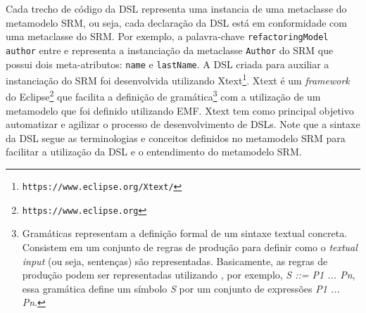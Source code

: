 Cada trecho de código da DSL representa uma instancia de uma metaclasse do metamodelo SRM, ou seja, cada declaração da DSL está em conformidade com uma metaclasse do SRM. Por exemplo, a palavra-chave \texttt{refactoringModel} \texttt{author} entre \aspas{\{} e \aspas{\}} representa a instanciação da metaclasse \texttt{Author} do SRM que possui dois meta-atributos: \texttt{name} e \texttt{lastName}. A DSL criada para auxiliar a instanciação do SRM foi desenvolvida utilizando Xtext\footnote{\texttt{https://www.eclipse.org/Xtext/}}. Xtext é um \textit{framework} do Eclipse\footnote{\texttt{https://www.eclipse.org}} que facilita a definição de gramática\footnote{Gramáticas representam a definição formal de um sintaxe textual concreta. Consistem em um conjunto de regras de produção para definir como o \textit{textual input} (ou seja, sentenças) são representadas. Basicamente, as regras de produção podem ser representadas utilizando , por exemplo, \textit{S ::= P1 ... Pn}, essa gramática define um símbolo \textit{S} por um conjunto de expressões \textit{P1 ... Pn}.} 
com a utilização de um metamodelo que foi definido utilizando EMF. Xtext tem como principal objetivo automatizar e agilizar o processo de desenvolvimento de DSLs. Note que a sintaxe da DSL segue as terminologias e conceitos definidos no metamodelo SRM para facilitar a utilização da DSL e o entendimento do metamodelo SRM.






